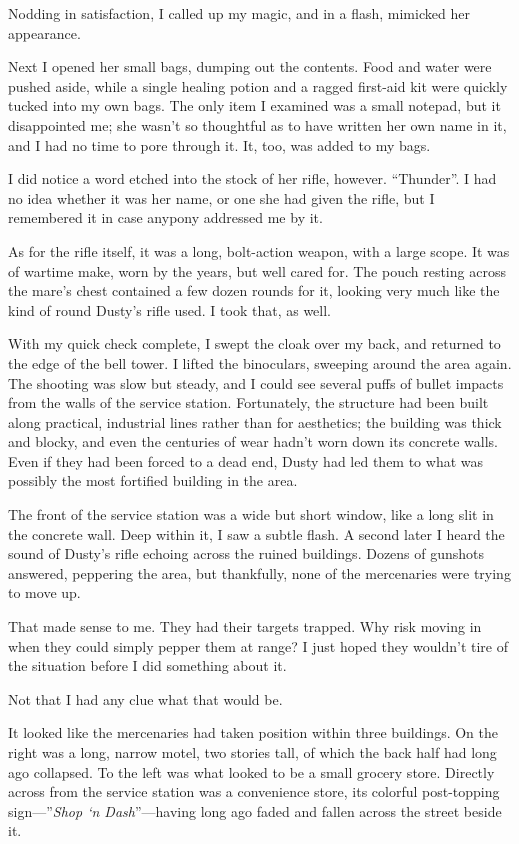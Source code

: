 Nodding in satisfaction, I called up my magic, and in a flash, mimicked her appearance.

Next I opened her small bags, dumping out the contents. Food and water were pushed aside, while a single healing potion and a ragged first-aid kit were quickly tucked into my own bags. The only item I examined was a small notepad, but it disappointed me; she wasn’t so thoughtful as to have written her own name in it, and I had no time to pore through it. It, too, was added to my bags.

I did notice a word etched into the stock of her rifle, however. “Thunder”. I had no idea whether it was her name, or one she had given the rifle, but I remembered it in case anypony addressed me by it.

As for the rifle itself, it was a long, bolt-action weapon, with a large scope. It was of wartime make, worn by the years, but well cared for. The pouch resting across the mare’s chest contained a few dozen rounds for it, looking very much like the kind of round Dusty’s rifle used. I took that, as well.

With my quick check complete, I swept the cloak over my back, and returned to the edge of the bell tower. I lifted the binoculars, sweeping around the area again. The shooting was slow but steady, and I could see several puffs of bullet impacts from the walls of the service station. Fortunately, the structure had been built along practical, industrial lines rather than for aesthetics; the building was thick and blocky, and even the centuries of wear hadn’t worn down its concrete walls. Even if they had been forced to a dead end, Dusty had led them to what was possibly the most fortified building in the area.

The front of the service station was a wide but short window, like a long slit in the concrete wall. Deep within it, I saw a subtle flash. A second later I heard the sound of Dusty’s rifle echoing across the ruined buildings. Dozens of gunshots answered, peppering the area, but thankfully, none of the mercenaries were trying to move up.

That made sense to me. They had their targets trapped. Why risk moving in when they could simply pepper them at range? I just hoped they wouldn’t tire of the situation before I did something about it.

Not that I had any clue what that would be.

It looked like the mercenaries had taken position within three buildings. On the right was a long, narrow motel, two stories tall, of which the back half had long ago collapsed. To the left was what looked to be a small grocery store. Directly across from the service station was a convenience store, its colorful post-topping sign—”\textit{Shop ‘n Dash}”—having long ago faded and fallen across the street beside it.

